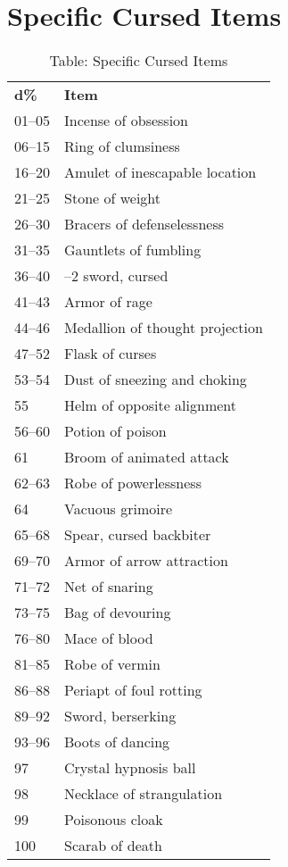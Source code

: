 \section{Specific Cursed Items}

\label{f0}
\begin{table}[]
\sffamily
\caption{Table: Specific Cursed Items}
\begin{tabular}{ll}
\textbf{d\%} & \textbf{Item}\\
01--05 & Incense of obsession \\
 06--15 & Ring of clumsiness \\
 16--20 & Amulet of inescapable location \\
 21--25 & Stone of weight \\
 26--30 & Bracers of defenselessness \\
 31--35 & Gauntlets of fumbling \\
 36--40 & --2 sword, cursed \\
 41--43 & Armor of rage \\
 44--46 & Medallion of thought projection \\
 47--52 & Flask of curses \\
 53--54 & Dust of sneezing and choking \\
 55 & Helm of opposite alignment \\
 56--60 & Potion of poison \\
 61 & Broom of animated attack \\
 62--63 & Robe of powerlessness \\
 64 & Vacuous grimoire \\
 65--68 & Spear, cursed backbiter \\
 69--70 & Armor of arrow attraction \\
 71--72 & Net of snaring \\
 73--75 & Bag of devouring \\
 76--80 & Mace of blood \\
 81--85 & Robe of vermin \\
 86--88 & Periapt of foul rotting \\
 89--92 & Sword, berserking \\
 93--96 & Boots of dancing \\
 97 & Crystal hypnosis ball \\
 98 & Necklace of strangulation \\
 99 & Poisonous cloak \\
 100 & Scarab of death\\
\end{tabular}
\end{table}

